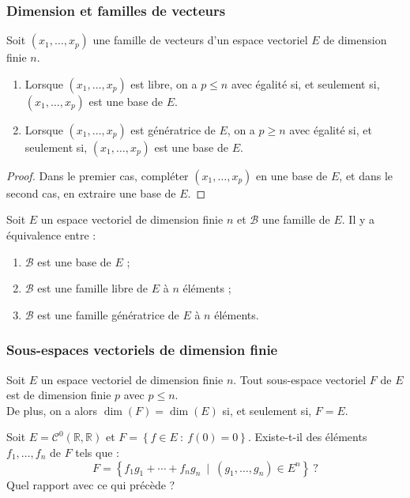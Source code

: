 \documentclass[french]{article}
\newcommand{\R}{\mathbb{R}}
\theoremstyle{plain}
\theoremstyle{definition}
\theoremstyle{remark}
\begin{document}
\subsubsection*{Dimension et familles de vecteurs}

\begin{prop}%
	Soit $(x_1,\ldots,x_p)$ une famille de vecteurs d'un espace vectoriel $E$ de dimension finie $n$.
	\begin{enumerate}
		\item Lorsque $(x_1,\ldots,x_p)$ est libre, on a $p\leqslant n$ avec égalité si, et seulement si, $(x_1,\ldots,x_p)$ est une base de $E$.
		\item Lorsque $(x_1,\ldots,x_p)$ est génératrice de $E$, on a $p\geqslant n$ avec égalité si, et seulement si, $(x_1,\ldots,x_p)$ est une base de $E$.
	\end{enumerate}
\end{prop}
\begin{proof}
	Dans le premier cas, compléter $(x_1,\ldots,x_p)$ en une base de $E$, et dans le second cas, en extraire une base de $E$.
\end{proof}

\begin{cor}%
	Soit $E$ un espace vectoriel de dimension finie $n$ et $\mathcal{B}$ une famille de $E$. Il y a équivalence entre :
	\begin{enumerate}[label=(\roman*)]
		\item $\mathcal{B}$ est une base de $E$ ;
		\item $\mathcal{B}$ est une famille libre de $E$ à $n$ éléments ;
		\item $\mathcal{B}$ est une famille génératrice de $E$ à $n$ éléments.
	\end{enumerate}
\end{cor}

\subsubsection*{Sous-espaces vectoriels de dimension finie}

\begin{prop}%
	Soit $E$ un espace vectoriel de dimension finie $n$. Tout sous-espace vectoriel $F$ de $E$ est de dimension finie $p$ avec $p\leqslant n$. \\
	De plus, on a alors $\dim(F)=\dim(E)$ si, et seulement si, $F=E$.
\end{prop}

\begin{exo}[$\star$]
	Soit $E=\mathcal{C}^0(\R,\R)$ et $F=\left\{f\in E\ :\ f(0)=0\right\}$. Existe-t-il des éléments $f_1,\ldots,f_n$ de $F$ tels que : $$F=\left\{f_1g_1+\cdots+f_ng_n\ \mid\ (g_1,\ldots,g_n)\in E^n\right\}\ ?$$ Quel rapport avec ce qui précède ?
\end{exo}
\end{document}
